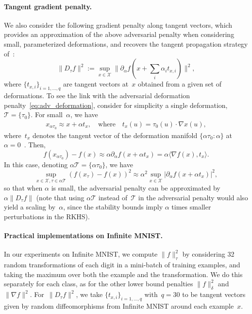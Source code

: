 \paragraph{Tangent gradient penalty.}
We also consider the following gradient penalty along tangent vectors,
which provides an approximation of the above adversarial penalty when
considering small, parameterized deformations,
and recovers the tangent propagation strategy of~\citet{simard1998transformation}:
\begin{equation}
\label{eq:tangent_gradient}
\|D_\tau f\|^2 := \sup_{x \in \mathcal X} \|\partial_\alpha f(x + \sum_i \alpha_i t_{x,i}) \|^2,
\end{equation}
where $\{t_{x,i}\}_{i=1,\ldots, q}$ are
tangent vectors at~$x$ obtained from a given set of deformations.
To see the link with the adversarial deformation penalty~\ref{eq:adv_deformation},
consider for simplicity a single deformation,~$\mathcal T = \{\tau_0\}$.
For small~$\alpha$, we have
\begin{align*}
x_{\alpha \tau_0} \approx x + \alpha t_x, \quad \text{where} \quad t_x(u) = \tau_0(u) \cdot \nabla x(u),
\end{align*}
where~$t_x$ denotes the tangent vector of the deformation
manifold $\{\alpha \tau_0 : \alpha\}$ at~$\alpha = 0$~\citep{simard1998transformation}.
Then,
\[
f(x_{\alpha\tau_0}) - f(x) \approx \alpha \partial_\alpha f(x + \alpha t_x) = \alpha \langle \nabla f(x), t_x \rangle.
\]
In this case, denoting $\alpha \mathcal T = \{\alpha \tau_0\}$, we have
\[
\sup_{x \in \mathcal X, \tau \in \alpha \mathcal T} (f(x_\tau) - f(x))^2 \approx \alpha^2 \sup_{x \in \mathcal X} |\partial_\alpha f(x + \alpha t_x)|^2,
\]
so that when $\alpha$ is small, the adversarial penalty can be approximated by $\alpha \|D_\tau f\|$
(note that using $\alpha \mathcal T$ instead of~$\mathcal T$ in the adversarial penalty
would also yield a scaling by~$\alpha$, since the stability bounds imply $\alpha$ times smaller
perturbations in the RKHS).

\paragraph{Practical implementations on Infinite MNIST.}
In our experiments on Infinite MNIST, we compute $\|f\|_\tau^2$ by considering 32 random transformations
of each digit in a mini-batch of training examples,
and taking the maximum over both the example and the transformation.
We do this separately for each class, as for the other lower bound penalties $\|f\|_\delta^2$ and $\|\nabla f\|^2$.
For~$\|D_\tau f\|^2$, we take $\{t_{x,i}\}_{i=1,\ldots,q}$ with~$q=30$ to be tangent vectors given
by random diffeomorphisms from Infinite MNIST around each example~$x$.
